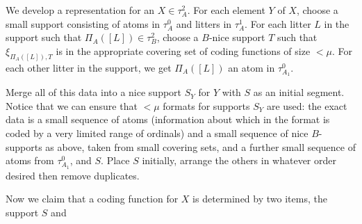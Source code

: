 \documentclass{slides}
\begin{document}
\begin{slide}

We develop a representation for an $X \in \tau^2_A$.  For each element $Y$ of $X$, choose a small support consisting of atoms in $\tau^0_A$ and litters in $\tau^1_A$.
For each litter $L$ in the support such that $\Pi_A([L]) \in \tau^2_B$, choose a $B$-nice support $T$ such that $\xi_{\Pi_A([L]),T}$ is in the appropriate covering set of coding functions
of size $<\mu$.  For each other litter in the support, we get $\Pi_A([L])$ an atom in $\tau^0_{A_1}$.

Merge all of this data into a nice support $S_Y$ for $Y$ with $S$ as an initial segment.  Notice that we can ensure that $<\mu$ formats for supports $S_Y$ are used:
the exact data is a small sequence of atoms (information about which in the format is coded by a very limited range of ordinals) and a small sequence of nice $B$-supports as above, taken from small covering sets, and a further small sequence of atoms from $\tau^0_{A_1}$, and $S$.  Place $S$ initially, arrange the others in whatever order desired then remove duplicates.

Now we claim that a coding function for $X$ is determined by two items, the support $S$ and 


\end{slide}
\end{document}
